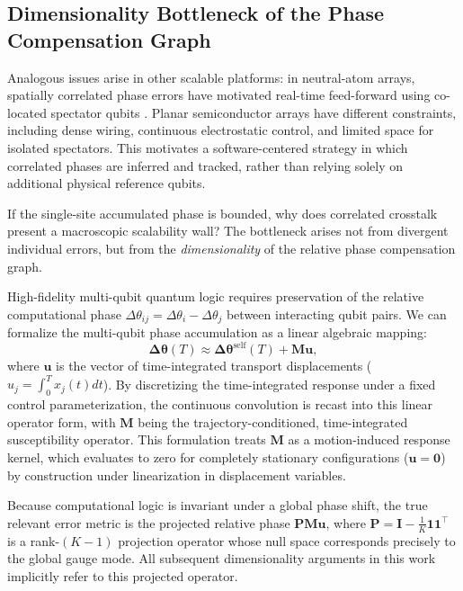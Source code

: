 \documentclass[a4paper,twocolumn,11pt]{quantumarticle}
\begin{document}
\subsection{Dimensionality Bottleneck of the Phase Compensation Graph}
\label{sec:calibration_bottleneck}

Analogous issues arise in other scalable platforms: in neutral-atom arrays, spatially correlated phase errors have motivated real-time feed-forward using co-located spectator qubits \cite{singh_mid-circuit_2023}. Planar semiconductor arrays have different constraints, including dense wiring, continuous electrostatic control, and limited space for isolated spectators. This motivates a software-centered strategy in which correlated phases are inferred and tracked, rather than relying solely on additional physical reference qubits.

If the single-site accumulated phase is bounded, why does correlated crosstalk present a macroscopic scalability wall? The bottleneck arises not from divergent individual errors, but from the \textit{dimensionality} of the relative phase compensation graph.

High-fidelity multi-qubit quantum logic requires preservation of the relative computational phase $\Delta\theta_{ij} = \Delta\theta_i - \Delta\theta_j$ between interacting qubit pairs. We can formalize the multi-qubit phase accumulation as a linear algebraic mapping:
\begin{equation}
    \boldsymbol{\Delta\theta}(T) \approx \boldsymbol{\Delta\theta}^{\text{self}}(T) + \mathbf{M} \mathbf{u},
    \label{eq:linear_algebra_phase}
\end{equation}
where $\mathbf{u}$ is the vector of time-integrated transport displacements ($u_j = \int_0^T x_j(t) dt$). By discretizing the time-integrated response under a fixed control parameterization, the continuous convolution is recast into this linear operator form, with $\mathbf{M}$ being the trajectory-conditioned, time-integrated susceptibility operator. This formulation treats $\mathbf{M}$ as a motion-induced response kernel, which evaluates to zero for completely stationary configurations ($\mathbf{u}=\mathbf{0}$) by construction under linearization in displacement variables. 

Because computational logic is invariant under a global phase shift, the true relevant error metric is the projected relative phase $\mathbf{P} \mathbf{M} \mathbf{u}$, where $\mathbf{P} = \mathbf{I} - \frac{1}{K}\mathbf{1}\mathbf{1}^\top$ is a rank-$(K-1)$ projection operator whose null space corresponds precisely to the global gauge mode. All subsequent dimensionality arguments in this work implicitly refer to this projected operator.
\end{document}
